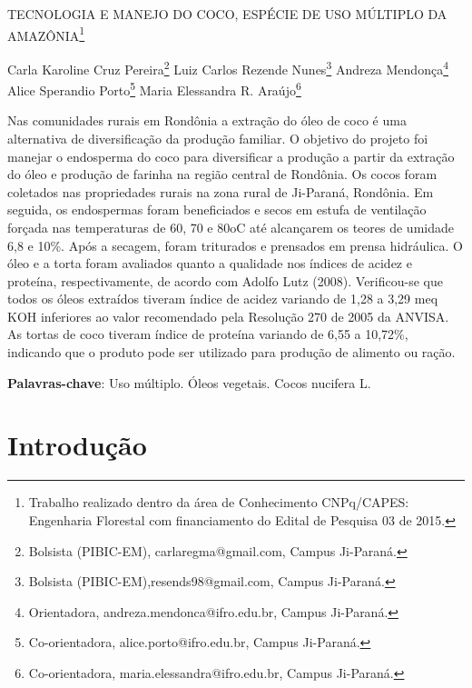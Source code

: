\documentclass[article,12pt,onesidea,4paper,english,brazil]{abntex2}
\begin{document}
	
	
	\frenchspacing 
	
	\begin{center}
		\LARGE TECNOLOGIA E MANEJO DO COCO, ESPÉCIE DE USO MÚLTIPLO DA AMAZÔNIA\footnote{Trabalho realizado dentro da área de Conhecimento CNPq/CAPES: Engenharia Florestal com financiamento do Edital de Pesquisa 03 de 2015.}
		
		\normalsize
	Carla Karoline Cruz Pereira\footnote{Bolsista (PIBIC-EM), carlaregma@gmail.com, Campus Ji-Paraná.} 
		Luiz Carlos Rezende Nunes\footnote{Bolsista (PIBIC-EM),resends98@gmail.com, Campus Ji-Paraná.} 
		Andreza Mendonça\footnote{Orientadora, andreza.mendonca@ifro.edu.br, Campus Ji-Paraná.} \\
		Alice Sperandio Porto\footnote{Co-orientadora, alice.porto@ifro.edu.br, Campus Ji-Paraná.}
	Maria Elessandra R. Araújo\footnote{Co-orientadora, maria.elessandra@ifro.edu.br, Campus Ji-Paraná.} 
	\end{center}
	
	\begin{resumoumacoluna}
	Nas comunidades rurais em Rondônia a extração do óleo de coco é uma alternativa de diversificação da produção familiar. O objetivo do projeto foi manejar o endosperma do coco para diversificar a produção a partir da extração do óleo e produção de farinha na região central de Rondônia. Os cocos foram coletados nas propriedades rurais na zona rural de Ji-Paraná, Rondônia. Em seguida, os endospermas foram beneficiados e secos em estufa de ventilação forçada nas temperaturas de 60, 70 e 80oC até alcançarem os teores de umidade 6,8 e 10\%. Após a secagem, foram triturados e prensados em prensa hidráulica. O óleo e a torta foram avaliados quanto a qualidade nos índices de acidez e proteína, respectivamente, de acordo com Adolfo Lutz (2008). Verificou-se que todos os óleos extraídos tiveram índice de acidez variando de 1,28 a 3,29 meq KOH inferiores ao valor recomendado pela Resolução 270 de 2005 da ANVISA. As tortas de coco tiveram índice de proteína variando de 6,55 a 10,72\%, indicando que o produto pode ser utilizado para produção de alimento ou ração.
		\vspace{\onelineskip}
		
		\noindent
		\textbf{Palavras-chave}: Uso múltiplo. Óleos vegetais. Cocos nucifera L.
	\end{resumoumacoluna}
	
	\section*{Introdução}
	
\end{document}
